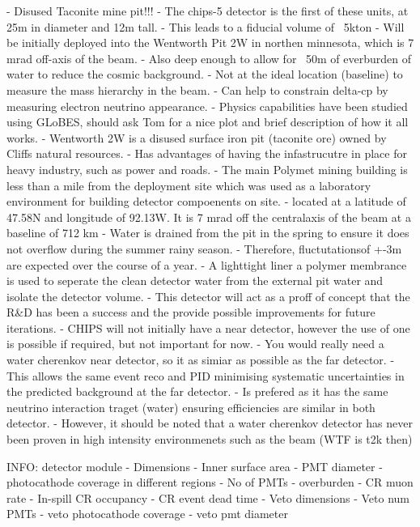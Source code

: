 - Disused Taconite mine pit!!!
- The chips-5 detector is the first of these units, at 25m in diameter and 12m tall.
- This leads to a fiducial volume of ~5kton
- Will be initially deployed into the Wentworth Pit 2W in northen minnesota, which is 7 mrad
off-axis of the \numi beam.
- Also deep enough to allow for ~50m of everburden of water to reduce the cosmic background.
- Not at the ideal location (baseline) to measure the mass hierarchy in the \numi beam.
- Can help to constrain delta-cp by measuring electron neutrino appearance.
- Physics capabilities have been studied using GLoBES, should ask Tom for a nice plot and brief
description of how it all works.
- Wentworth 2W is a disused surface iron pit (taconite ore) owned by Cliffs natural resources.
- Has advantages of having the infastrucutre in place for heavy industry, such as power and roads.
- The main Polymet mining building is less than a mile from the deployment site which was used as
a laboratory environment for building detector compoenents on site.
- located at a latitude of 47.58N and longitude of 92.13W. It is 7 mrad off the centralaxis of the
\numi beam at a baseline of 712 km
- Water is drained from the pit in the spring to ensure it does not overflow during the summer
rainy season.
- Therefore, fluctutationsof +-3m are expected over the course of a year.
- A lighttight liner a polymer membrance is used to seperate the clean detector water from the
external pit water and isolate the detector volume.
- This detector will act as a proff of concept that the R\&D has been a success and the provide
possible improvements for future iterations.
- CHIPS will not initially have a near detector, however the use of \nova one is possible if
required, but not important for now.
- You would really need a water cherenkov near detector, so it as simiar as possible as the far
detector.
- This allows the same event reco and PID minimising systematic uncertainties in the predicted
background at the far detector.
- Is prefered as it has the same neutrino interaction traget (water) ensuring efficiencies are
similar in both detector.
- However, it should be noted that a water cherenkov detector has never been proven in high
intensity environmenets such as the \numi beam (WTF is t2k then)

INFO: detector module
- Dimensions
- Inner surface area
- PMT diameter
- photocathode coverage in different regions
- No of PMTs
- overburden
- CR muon rate
- In-spill CR occupancy
- CR event dead time
- Veto dimensions
- Veto num PMTs
- veto photocathode coverage
- veto pmt diameter

